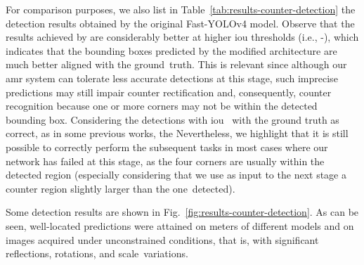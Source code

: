 For comparison purposes, we also list in Table~\ref{tab:results-counter-detection} the detection results obtained by the original Fast-YOLOv4 model. 
Observe that the results achieved by \detnet are considerably better at higher \gls*{iou} thresholds (i.e., -), which indicates that the bounding boxes predicted by the modified architecture are much better aligned with the ground~truth.
This is relevant since although our \gls*{amr} system can tolerate less accurate detections at this stage, such imprecise predictions may still impair counter rectification and, consequently, counter recognition because one or more corners may not be within the detected bounding box.
Considering the detections with \gls*{iou}~ with the ground truth as correct, as in some previous works, the \detnet {}
Nevertheless, we highlight that it is still possible to correctly perform the subsequent tasks in most cases where our network has failed at this stage, as the four corners are usually within the detected region (especially considering that we use as input to the next stage a counter region slightly larger than the one~detected).

Some detection results are shown in Fig.~\ref{fig:results-counter-detection}.
As can be seen, well-located predictions were attained on meters of different models and on images acquired under unconstrained conditions, that is, with significant reflections, rotations, and scale~variations.

